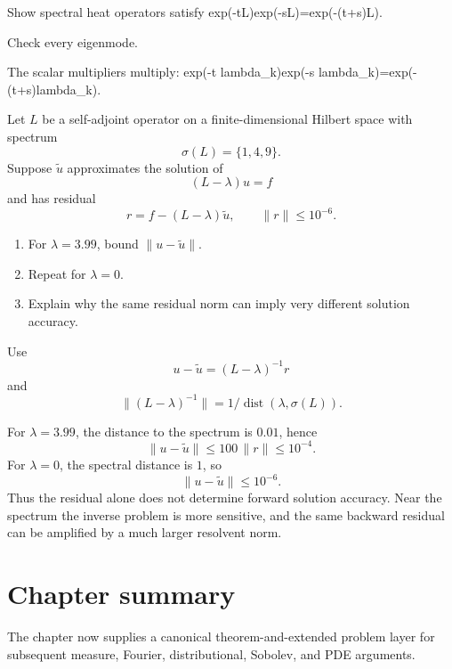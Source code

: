 \begin{exercise}\label{exr:iii28-expand-16}
Show spectral heat operators satisfy exp(-tL)exp(-sL)=exp(-(t+s)L).
\end{exercise}
\begin{hint}
Check every eigenmode.
\end{hint}
\begin{solution}
The scalar multipliers multiply: exp(-t lambda\_k)exp(-s lambda\_k)=exp(-(t+s)lambda\_k).
\end{solution}
\begin{exercise}\label{exr:iii28-numerical-resolvent-01}
Let \(L\) be a self-adjoint operator on a finite-dimensional Hilbert space with
spectrum
\[
\sigma(L)=\{1,4,9\}.
\]
Suppose \(\widetilde u\) approximates the solution of
\[
(L-\lambda)u=f
\]
and has residual
\[
r=f-(L-\lambda)\widetilde u,
\qquad
\|r\|\le10^{-6}.
\]

\begin{enumerate}
\item For \(\lambda=3.99\), bound \(\|u-\widetilde u\|\).
\item Repeat for \(\lambda=0\).
\item Explain why the same residual norm can imply very different solution
accuracy.
\end{enumerate}
\end{exercise}
\begin{hint}
Use
\[
u-\widetilde u=(L-\lambda)^{-1}r
\]
and
\[
\|(L-\lambda)^{-1}\|
=
1/\operatorname{dist}(\lambda,\sigma(L)).
\]
\end{hint}
\begin{solution}
For \(\lambda=3.99\), the distance to the spectrum is \(0.01\), hence
\[
\|u-\widetilde u\|
\le
100\,\|r\|
\le
10^{-4}.
\]
For \(\lambda=0\), the spectral distance is \(1\), so
\[
\|u-\widetilde u\|
\le
10^{-6}.
\]
Thus the residual alone does not determine forward solution accuracy.
Near the spectrum the inverse problem is more sensitive, and the same
backward residual can be amplified by a much larger resolvent norm.
\end{solution}

\section*{Chapter summary}
The chapter now supplies a canonical theorem-and-extended problem layer for subsequent measure, Fourier, distributional, Sobolev, and PDE arguments.
